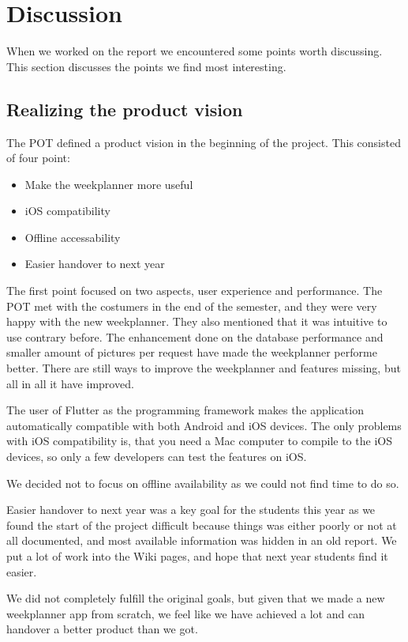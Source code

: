 \section{Discussion}

When we worked on the report we encountered some points worth discussing. This section discusses the points we find most interesting. 

\subsection{Realizing the product vision}
The \gls{POT} defined a product vision in the beginning of the project. This consisted of four point:
\begin{itemize}
    \item Make the weekplanner more useful
    \item iOS compatibility
    \item Offline accessability
    \item Easier handover to next year
\end{itemize}
The first point focused on two aspects, user experience and performance. The \gls{POT} met with the costumers in the end of the semester, and they were very happy with the new weekplanner. They also mentioned that it was intuitive to use contrary before. The enhancement done on the database performance and smaller amount of pictures per request have made the weekplanner performe better. There are still ways to improve the weekplanner and features missing, but all in all it have improved.

The user of Flutter as the programming framework makes the application automatically compatible with both Android and iOS devices. The only problems with iOS compatibility is, that you need a Mac computer to compile to the iOS devices, so only a few developers can test the features on iOS. 

We decided not to focus on offline availability as we could not find time to do so.

Easier handover to next year was a key goal for the students this year as we found the start of the project difficult because things was either poorly or not at all documented, and most available information was hidden in an old report. We put a lot of work into the Wiki pages, and hope that next year students find it easier.

We did not completely fulfill the original goals, but given that we made a new weekplanner app from scratch, we feel like we have achieved a lot and can handover a better product than we got.

